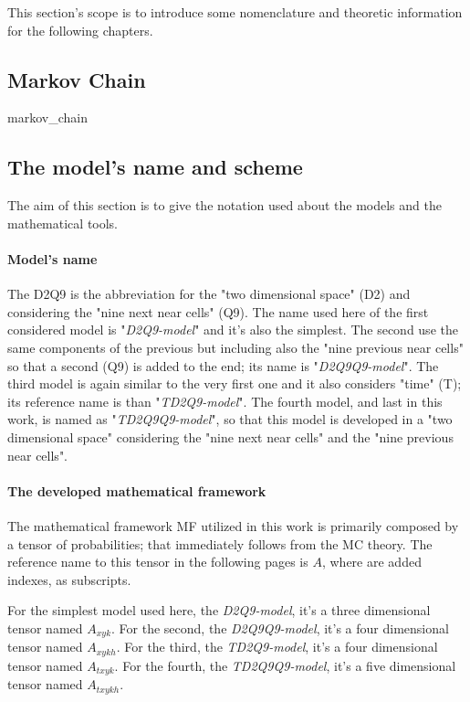 \documentclass[class=article, crop=false]{standalone}
\begin{document}
This section's scope is to introduce some nomenclature and theoretic information for the following chapters.

\subsection{Markov Chain} %
	{markov_chain}
	

\FloatBarrier
\subsection{The model's name and scheme}
The aim of this section is to give the notation used about the models and the mathematical tools.

\paragraph{Model's name}
The D2Q9 is the abbreviation for the "two dimensional space" (D2) and considering the "nine next near cells" (Q9).
The name used here of the first considered model is "\emph{D2Q9-model}" and it's also the simplest.
The second use the same components of the previous but including also the "nine previous near cells" so that a second (Q9) is added to the end; its name is "\emph{D2Q9Q9-model}".
The third model is again similar to the very first one and it also considers "time" (T); its reference name is than "\emph{TD2Q9-model}".
The fourth model, and last in this work, is named as "\emph{TD2Q9Q9-model}", so that this model is developed in a "two dimensional space" considering the "nine next near cells" and the "nine previous near cells".


\paragraph{The developed mathematical framework}
The mathematical framework MF utilized in this work is primarily composed by a tensor of probabilities; that immediately follows from the MC theory.
The reference name to this tensor in the following pages is $A$, where are added indexes, as subscripts.

For the simplest model used here, the \emph{D2Q9-model}, it's a three dimensional tensor named $A_{x y k}$.
For the second, the \emph{D2Q9Q9-model}, it's a four dimensional tensor named $A_{x y k h}$.
For the third, the \emph{TD2Q9-model}, it's a four dimensional tensor named $A_{t x y k}$.
For the fourth, the \emph{TD2Q9Q9-model}, it's a five dimensional tensor named $A_{t x y k h}$.


\end{document}
